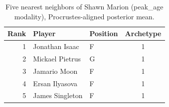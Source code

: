 \begin{table}[htbp]
  \centering\small
  \begin{tabular}{rllc}
    \toprule
    Rank & Player & Position & Archetype \\
    \midrule
    1 & Jonathan Isaac & F & 1 \\
    2 & Mickael Pietrus & G & 1 \\
    3 & Jamario Moon & F & 1 \\
    4 & Ersan Ilyasova & F & 1 \\
    5 & James Singleton & F & 1 \\
    \bottomrule
  \end{tabular}
  \caption{Five nearest neighbors of Shawn Marion (peak_age modality), Procrustes-aligned posterior mean.}
  \label{tab:Shawn_Marion_neighbors_peak_age}
\end{table}

